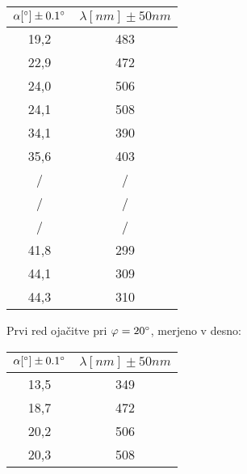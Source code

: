\documentclass[a4paper]{report}
\begin{document}
\begin{center}
  \begin{tabular}{|c|c|}
  \hline
      $\alpha [\degree] \pm 0.1\degree $& $\lambda [nm] \pm 50nm$\\ 
      \hline
      19,2 &   483\\
      22,9 &   472\\
      24,0 &   506\\
      24,1 &   508\\ \hline
      34,1 &   390\\
      35,6 &   403\\
      / &  /\\
      / &  /\\ \hline
      / &  /\\
      41,8 & 299 \\
      44,1 & 309 \\
      44,3 & 310 \\ \hline
  \end{tabular}
\end{center}

Prvi red ojačitve pri $\varphi = 20 \degree$, merjeno v desno:


\begin{center}
  \begin{tabular}{|c|c|} \hline
      $\alpha [\degree] \pm 0.1\degree$ & $\lambda [nm] \pm 50nm$\\ 
      \hline
      13,5 &   349\\
      18,7 &   472\\
      20,2 &   506\\
      20,3 &   508\\ \hline
  \end{tabular}
\end{center}
\end{document}
